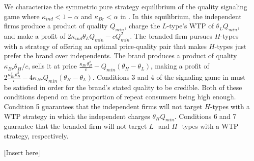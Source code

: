 \documentclass[12pt, leqno]{article}
\begin{document}
We characterize the symmetric pure strategy equilibrium of the quality signaling game where $\kappa_{ind}<1-\alpha$ and $\kappa_{Br}<\alpha$ in . In this equilibrium, the independent firms produce a product of quality $Q_{min}$, charge the $L$-type's WTP of $\theta_LQ_{min}$, and make a profit of $2 \kappa_{ind} \theta_L Q_{min} - c Q_{min}^2$. The branded firm pursues $H$-types with a strategy of offering an optimal price-quality pair that makes $H$-types just prefer the brand over independents. The brand produces a product of quality $\kappa_{Br}\theta_H/c$, sells it at price $\frac{\kappa_{Br}\theta_H^2}{c}-Q_{min}(\theta_H-\theta_L)$, making a profit of $2\frac{\kappa_{Br}^2\theta_H^2}{c}-4\kappa_{Br} Q_{min}(\theta_H-\theta_L)$. Conditions 3 and 4 of the signaling game in  must be satisfied in order for the brand's stated quality to be credible. Both of these conditions depend on the proportion of repeat consumers being high enough. Condition 5 guarantees that the independent firms will not target $H$-types with a WTP strategy in which the independent charges $\theta_HQ_{min}$. Conditions 6 and 7 guarantee that the branded firm will not target $L$- and $H$- types with a WTP strategy, respectively. %

[Insert  here]
\end{document}
